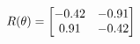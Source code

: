 \documentclass[preview]{standalone}
\begin{document}
\begin{align*}
\special{dvisvgm:raw <g id='unique000'>}R(\theta) = \begin{bmatrix}-0.42 & -0.91\\0.91 & -0.42\end{bmatrix}\special{dvisvgm:raw </g>}
\end{align*}
\end{document}
